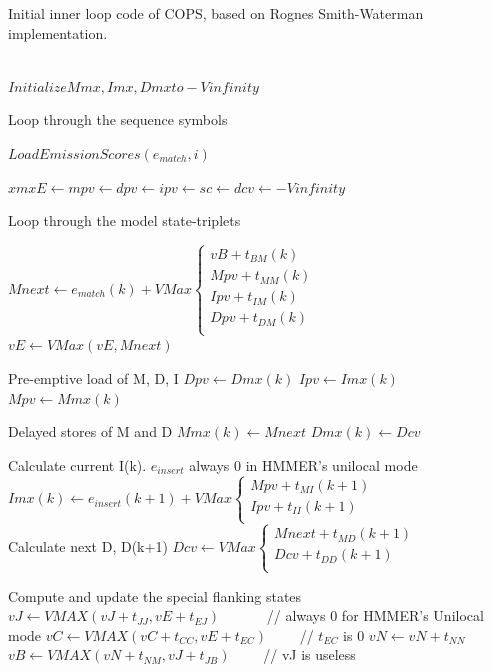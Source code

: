 \clearpage


\begin{algorithm}[htb!]
\caption[Initial inner loop code of COPS] {Initial inner loop code of COPS, based on Rognes Smith-Waterman implementation.}
\label{code-rognes}

\begin{algorithmic}
\\
\State $Initialize Mmx, Imx, Dmx to -Vinfinity$

\LeftComment Loop through the sequence symbols
		
	\State $LoadEmissionScores(e_{match}, i)$

	\State $ xmxE \gets mpv \gets dpv \gets ipv \gets sc \gets dcv \gets -Vinfinity $

	\LeftComment Loop through the model state-triplets

		\State $ Mnext \gets e_{match}(k) +  VMax
					\begin{cases}
						vB + t_{BM}(k)	\\
						Mpv + t_{MM}(k)	\\
						Ipv + t_{IM}(k)	\\
						Dpv + t_{DM}(k)	\\
					\end{cases} $ \\

		\State $ vE \gets VMax(vE, Mnext) $
		
		\LeftComment Pre-emptive load of M, D, I
		\State $ Dpv \gets Dmx(k) $
		\State $ Ipv  \gets Imx(k)  $
		\State $ Mpv \gets Mmx(k) $

		\LeftComment  Delayed stores of M and D
		\State $ Mmx(k) \gets Mnext $
		\State $ Dmx(k) \gets Dcv   $
		
		\LeftComment Calculate current I(k). $ e_{insert}$  always 0 in HMMER's unilocal mode
		\State $ Imx(k) \gets e_{insert} (k+1) + VMax
					\begin{cases}
						Mpv +  t_{MI}(k+1)	\\
						Ipv +  t_{II}(k+1)		\\
					\end{cases} $ \\

		\LeftComment Calculate next D, D(k+1)
		\State $ Dcv \gets VMax
					\begin{cases}
						Mnext +  t_{MD}(k+1)	\\
						Dcv +  t_{DD}(k+1)	\\
					\end{cases} $ 
	\EndFor
	
	\LeftComment Compute and update the special flanking states
	\State $ vJ  \gets VMAX(vJ + t_{JJ}, vE + t_{EJ})   $	\ \ \ \ \ \ // always 0 for HMMER's Unilocal mode
	\State $ vC \gets VMAX(vC + t_{CC}, vE + t_{EC}) $	\ \ \ \	// $t_{EC}$  is  0 
	\State $ vN \gets vN + t_{NN} $
	\State $ vB \gets VMAX(vN + t_{NM}, vJ + t_{JB})  $	\ \ \ \	// vJ is useless
\EndFor

\end{algorithmic}
\end{algorithm}

